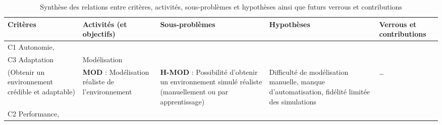 \begin{table}[H]
  \centering
  \caption{Synthèse des relations entre critères, activités, sous-problèmes et hypothèses ainsi que futurs verrous et contributions}
  \label{tab:processus-methode}
  \renewcommand{\arraystretch}{1.2}
  \scriptsize
  \begin{tabularx}{\textwidth}{
      >{\raggedright\arraybackslash\hsize=0.20\hsize}X
      >{\raggedright\arraybackslash\hsize=0.20\hsize}X
      >{\raggedright\arraybackslash\hsize=0.25\hsize}X
      >{\raggedright\arraybackslash\hsize=0.26\hsize}X
      >{\raggedright\arraybackslash\hsize=0.09\hsize}X
    }
    \toprule
    \textbf{Critères}                                                                                                     & \textbf{Activités (et objectifs)} & \textbf{Sous-problèmes} & \textbf{Hypothèses} & \textbf{Verrous et contributions} \\
    \midrule
    C1 Autonomie,                                                                                                                                                                                                                                 \\
    C3 Adaptation
                                                                                                                          &
    Modélisation                                                                                                                                                                                                                                  \\
    (Obtenir un environnement crédible et adaptable)
                                                                                                                          &
    \textbf{MOD} : Modélisation réaliste de l'environnement
                                                                                                                          &
    \vspace{-1.05cm}\textbf{H-MOD} : Possibilité d'obtenir un environnement simulé réaliste (manuellement ou par apprentissage)
                                                                                                                          &
    \vspace{-1.05cm}Difficulté de modélisation manuelle, manque d'automatisation, fidélité limitée des simulations        & \dots
    \\
    \addlinespace[2pt]
    \hdashline
    \addlinespace[2pt]
    C2 Performance,                                                                                                                                                                                                                               \\

\end{tabularx}
\end{table}
